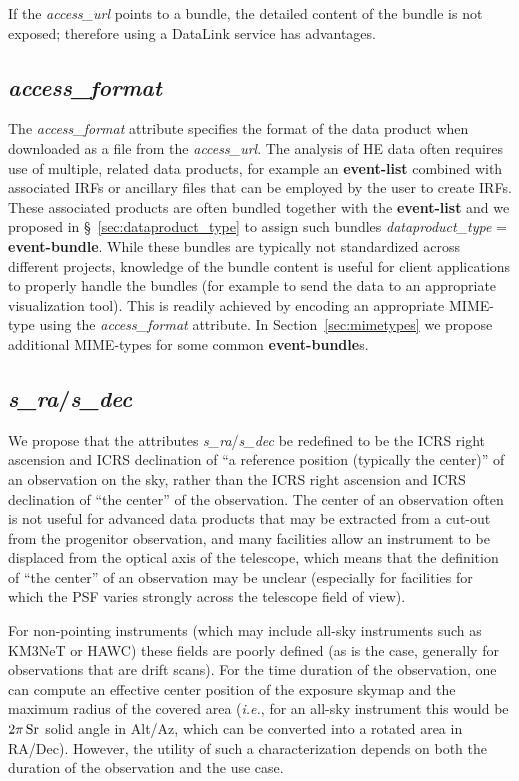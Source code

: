 \documentclass[11pt,a4paper]{ivoa}
\begin{document}
If the {\em access\_url} points to a bundle, the detailed content of the bundle is not exposed; therefore using a DataLink service has advantages.


\subsection{{\em access\_format}}

The {\em access\_format\/} attribute specifies the format of the data product when downloaded as a file from the {\em access\_url\/}.  The analysis of HE data often requires use of multiple, related data products, for example an {\bf event-list} combined with associated IRFs or ancillary files that can be employed by the user to create IRFs.  These associated products are often bundled together with the {\bf event-list} and we proposed in \S~\ref{sec:dataproduct_type} to assign such bundles {\em dataproduct\_type\/} = {\bf event-bundle}.  While these bundles are typically not standardized across different projects, knowledge of the bundle content is useful for client applications to properly handle the bundles (for example to send the data to an appropriate visualization tool).  This is readily achieved by encoding an appropriate MIME-type using the {\em access\_format\/} attribute.  In Section~\ref{sec:mimetypes} we propose additional MIME-types for some common {\bf event-bundle}s.

\subsection{{\em s\_ra\/}/{\em s\_dec}}

We propose that the attributes {\em s\_ra\/}/{\em s\_dec} be redefined to be the ICRS right ascension and ICRS declination of ``a reference position (typically the center)'' of an observation on the sky, rather than the ICRS right ascension and ICRS declination of ``the center'' of the observation.  The center of an observation often is not useful for advanced data products that may be extracted from a cut-out from the progenitor observation, and many facilities allow an instrument to be displaced from the optical axis of the telescope, which means that the definition of ``the center'' of an observation may be unclear (especially for facilities for which the PSF varies strongly across the telescope field of view).

For non-pointing instruments (which may include all-sky instruments such as KM3NeT or HAWC) these fields are poorly defined (as is the case, generally for observations that are drift scans).  For the time duration of the observation, one can compute an effective center position of the exposure skymap and the maximum radius of the covered area ({\em i.e.\/}, for an all-sky instrument this would be $2\pi\,\rm Sr$ solid angle in Alt/Az, which can be converted into a rotated area in RA/Dec).  However, the utility of such a characterization depends on both the duration of the observation and the use case.
\end{document}
